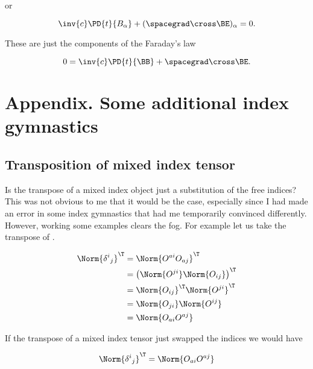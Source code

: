 or

\begin{equation}\label{eqn:relativisticElectrodynamicsL11:1360}
\inv{c} \PD{t}{B_\alpha} + (\spacegrad \cross \BE)_\alpha = 0.
\end{equation}

These are just the components of the Faraday's law

\begin{equation}\label{eqn:relativisticElectrodynamicsL11:930}
0 = \inv{c} \PD{t}{\BB} + \spacegrad \cross \BE.
\end{equation}

\section{Appendix. Some additional index gymnastics}

\subsection{Transposition of mixed index tensor}

Is the transpose of a mixed index object just a substitution of the free indices?  This was not obvious to me that it would be the case, especially since I had made an error in some index gymnastics that had me temporarily convinced differently.  However, working some examples clears the fog.  For example let us take the transpose of .  

\begin{equation}\label{eqn:relativisticElectrodynamicsL11b:1440}
\begin{aligned}
\Norm{ {\delta^i}_j }^\T 
&= 
\Norm{ O^{a i} O_{a j} }^\T \\
&= 
\left( \Norm{ O^{j i} } \Norm{ O_{i j} } \right)^\T \\
&=
\Norm{ O_{i j} }^\T
\Norm{ O^{j i} }^\T  \\
&=
\Norm{ O_{j i} }
\Norm{ O^{i j} } \\
&=
\Norm{ O_{a i} O^{a j} } \\
\end{aligned}
\end{equation}

If the transpose of a mixed index tensor just swapped the indices we would have

\begin{equation}\label{eqn:relativisticElectrodynamicsL11:1060}
\Norm{ {\delta^i}_j }^\T = \Norm{ O_{a i} O^{a j} } 
\end{equation}

